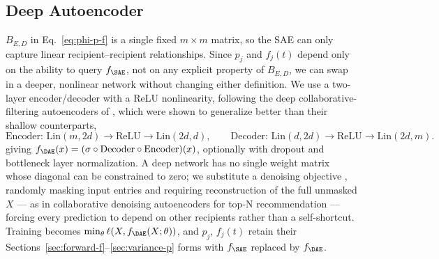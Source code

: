 \subsection{Deep Autoencoder}
\label{sec:deep-ae}

$B_{E,D}$ in Eq.~\eqref{eq:phi-p-f} is a single fixed $m\times m$ matrix,
so the SAE can only capture linear recipient--recipient relationships.
Since $p_j$ and $f_j(t)$ depend only on the ability to query $f_{\SAE}$, not on any explicit
property of $B_{E,D}$, we can swap in a deeper, nonlinear network without
changing either definition. We use a two-layer encoder/decoder with a ReLU
nonlinearity, following the deep collaborative-filtering autoencoders of
\citet{kuchaiev2017training}, which were shown to generalize better than
their shallow counterparts,
\begin{equation}
\label{eq:deep-ae}
\text{Encoder: Lin}(m,2d)\to\text{ReLU}\to\text{Lin}(2d,d),
\qquad
\text{Decoder: Lin}(d,2d)\to\text{ReLU}\to\text{Lin}(2d,m).
\end{equation}
giving $f_{\DAE}(x) = (\sigma\circ\text{Decoder}\circ\text{Encoder})(x)$,
optionally with dropout \citep{srivastava2014dropout} and bottleneck layer
normalization. A deep network has no single weight matrix whose diagonal
can be constrained to zero; we substitute a denoising objective
\citep{vincent2008extracting}, randomly masking input entries and
requiring reconstruction of the full unmasked $X$ --- as in collaborative
denoising autoencoders for top-N recommendation \citep{wu2016collaborative}
--- forcing every prediction to depend on other recipients rather than a
self-shortcut. Training becomes
$\min_\theta \ell(X, f_{\DAE}(X;\theta))$, and $p_j$, $f_j(t)$ retain their
Sections~\ref{sec:forward-f}--\ref{sec:variance-p} forms with $f_{\SAE}$
replaced by $f_{\DAE}$.
